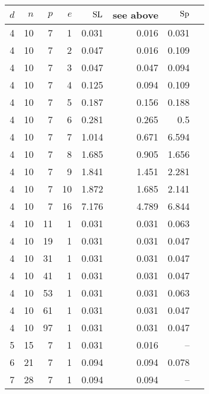 \documentclass[12pt]{report}
\def\SL{{\rm SL}}
\def\Sp{{\rm Sp}}
\begin{document}
\begin{table}[htp]													
\label{timings}													
\begin{center}													
\begin{tabular}													
{|c|r|r|r|r|r||r|r|} \hline													
$d$	&	$n$	&	$p$ 	&	$e$ 	&	$\SL$ 	&	{\tiny see above}	&	$\Sp$ 	
\rule{0cm}{2.5ex}\\ \hline
4	&	10	&	7	&	1	&	0.031	&	0.016	&	0.031	\rule{0cm}{2.5ex}\\ \hline
4	&	10	&	7	&	2	&	0.047	&	0.016	&	0.109	\rule{0cm}{2.5ex}\\ \hline
4	&	10	&	7	&	3	&	0.047	&	0.047	&	0.094	\rule{0cm}{2.5ex}\\ \hline
4	&	10	&	7	&	4	&	0.125	&	0.094	&	0.109	\rule{0cm}{2.5ex}\\ \hline
4	&	10	&	7	&	5	&	0.187	&	0.156	&	0.188	\rule{0cm}{2.5ex}\\ \hline
4	&	10	&	7	&	6	&	0.281	&	0.265	&	0.5	\rule{0cm}{2.5ex}\\ \hline
4	&	10	&	7	&	7	&	1.014	&	0.671	&	6.594	\rule{0cm}{2.5ex}\\ \hline
4	&	10	&	7	&	8	&	1.685	&	0.905	&	1.656	\rule{0cm}{2.5ex}\\ \hline
4	&	10	&	7	&	9	&	1.841	&	1.451	&	2.281	\rule{0cm}{2.5ex}\\ \hline
4	&	10	&	7	&	10	&	1.872	&	1.685	&	2.141	\rule{0cm}{2.5ex}\\ \hline
4	&	10	&	7	&	16	&	7.176	&	4.789	&	6.844	\rule{0cm}{2.5ex}\\ \hline
4	&	10	&	11	&	1	&	0.031	&	0.031	&	0.063	\rule{0cm}{2.5ex}\\ \hline
4	&	10	&	19	&	1	&	0.031	&	0.031	&	0.047	\rule{0cm}{2.5ex}\\ \hline
4	&	10	&	31	&	1	&	0.031	&	0.031	&	0.047	\rule{0cm}{2.5ex}\\ \hline
4	&	10	&	41	&	1	&	0.031	&	0.031	&	0.047	\rule{0cm}{2.5ex}\\ \hline
4	&	10	&	53	&	1	&	0.031	&	0.031	&	0.063	\rule{0cm}{2.5ex}\\ \hline
4	&	10	&	61	&	1	&	0.031	&	0.031	&	0.047	\rule{0cm}{2.5ex}\\ \hline
4	&	10	&	97	&	1	&	0.031	&	0.031	&	0.047	\rule{0cm}{2.5ex}\\ \hline
5	&	15	&	7	&	1	&	0.031	&	0.016	&	--	\rule{0cm}{2.5ex}\\ \hline
6	&	21	&	7	&	1	&	0.094	&	0.094	&	0.078	\rule{0cm}{2.5ex}\\ \hline
7	&	28	&	7	&	1	&	0.094	&	0.094	&	--	\rule{0cm}{2.5ex}\\ \hline

\end{tabular}
\end{center}
\end{table}
\end{document}
